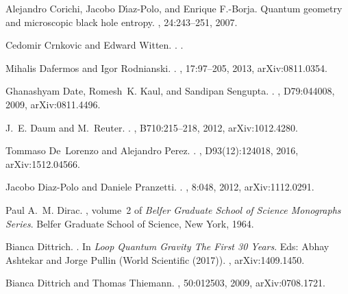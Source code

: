 \documentclass[aps, nofootinbib,superscriptaddress,12pt]{revtex4-2}
\begin{document}
\begin{thebibliography}{100}
Alejandro Corichi, Jacobo D\'{\i}az-Polo, and Enrique F.-Borja.
\newblock Quantum geometry and microscopic black hole entropy.
, 24:243--251, 2007.

Cedomir Crnkovic and Edward Witten.
.
.

Mihalis Dafermos and Igor Rodnianski.
.
, 17:97--205, 2013, arXiv:0811.0354.

Ghanashyam Date, Romesh~K. Kaul, and Sandipan Sengupta.
.
, D79:044008, 2009, arXiv:0811.4496.

J.~E. Daum and M.~Reuter.
.
, B710:215--218, 2012, arXiv:1012.4280.

Tommaso De~Lorenzo and Alejandro Perez.
.
, D93(12):124018, 2016, arXiv:1512.04566.

Jacobo Diaz-Polo and Daniele Pranzetti.
.
, 8:048, 2012, arXiv:1112.0291.

Paul A.~M. Dirac.
, volume~2 of {\em Belfer Graduate
  School of Science Monographs Series}.
\newblock Belfer Graduate School of Science, New York, 1964.

Bianca Dittrich.
. In  {\em Loop Quantum Gravity The First 30 Years}.
Eds: Abhay Ashtekar and Jorge Pullin (World Scientific (2017)).
, arXiv:1409.1450.

Bianca Dittrich and Thomas Thiemann.
, 50:012503, 2009, arXiv:0708.1721.


\end{thebibliography}
\end{document}
